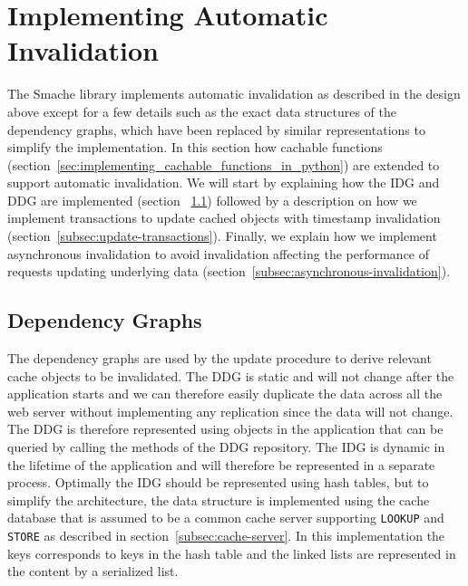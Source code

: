 
\section{Implementing Automatic Invalidation}
\label{sec:implementing-automatic-invalidation}

The Smache library implements automatic invalidation as described in the design above except for a few details such as the exact data structures of the dependency graphs, which have been replaced by similar representations to simplify the implementation. In this section how cachable functions (section~\ref{sec:implementing_cachable_functions_in_python}) are extended to support automatic invalidation. We will start by explaining how the IDG and DDG are implemented (section ~\ref{subsec:dependency-graphs}) followed by a description on how we implement transactions to update cached objects with timestamp invalidation (section~\ref{subsec:update-transactions}). Finally, we explain how we implement asynchronous invalidation to avoid invalidation affecting the performance of requests updating underlying data (section~\ref{subsec:asynchronous-invalidation}).

\subsection{Dependency Graphs}
\label{subsec:dependency-graphs}

The dependency graphs are used by the update procedure to derive relevant cache objects to be invalidated.
The DDG is static and will not change after the application starts and we can therefore easily duplicate the data across all the web server without implementing any replication since the data will not change. The DDG is therefore represented using objects in the application that can be queried by calling the methods of the DDG repository.
The IDG is dynamic in the lifetime of the application and will therefore be represented in a separate process. Optimally the IDG should be represented using hash tables, but to simplify the architecture, the data structure is implemented using the cache database that is assumed to be a common cache server supporting \verb$LOOKUP$ and \verb$STORE$ as described in section~\ref{subsec:cache-server}. In this implementation the keys corresponds to keys in the hash table and the linked lists are represented in the content by a serialized list.



